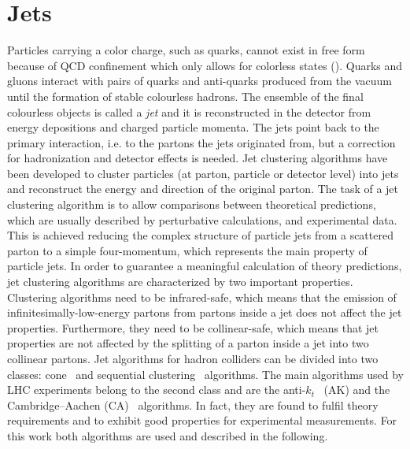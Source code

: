 \section{Jets}\label{sec:jets}

Particles carrying a color charge, such as quarks, cannot exist in free form because of QCD confinement which only allows for colorless states (). Quarks and gluons interact with pairs of quarks and anti-quarks produced from the vacuum until the formation of stable colourless hadrons. The ensemble of the final colourless objects is called a {\itshape jet} and it is reconstructed in the detector from energy depositions and charged particle momenta.
The jets point back to the primary interaction, i.e. to the partons the jets originated from, but a correction for hadronization and detector effects is needed. Jet clustering algorithms have been developed to cluster particles (at parton, particle or detector level) into jets and reconstruct the energy and direction of the original parton. The task of a jet clustering algorithm is to allow comparisons between theoretical predictions, which are usually described by perturbative calculations, and experimental data. This is achieved reducing the complex structure of particle jets from a scattered parton to a simple four-momentum, which represents the main property of particle jets.
In order to guarantee a meaningful calculation of theory predictions, jet clustering algorithms are characterized by two important properties.
Clustering algorithms need to be infrared-safe, which means that the emission of infinitesimally-low-energy partons from partons inside a jet does not affect the jet properties. Furthermore, they need to be collinear-safe, which means that jet properties are not affected by the splitting of a parton inside a jet into two collinear partons.
Jet algorithms for hadron colliders can be divided into two classes: cone~\cite{Salam:2007xv} and sequential clustering~\cite{Catani:1993hr,Ellis:1993tq,Dokshitzer:1997in,Wobisch:1998wt,Cacciari:2008gp} algorithms.
The main algorithms used by LHC experiments belong to the second class and are the anti-$k_t$~\cite{Cacciari:2008gp} (AK) and the Cambridge--Aachen (CA)~\cite{Catani:1993hr,Dokshitzer:1997in} algorithms. In fact, they are found to fulfil theory requirements and to exhibit good properties for experimental measurements. For this work both algorithms are used and described in the following.
 
